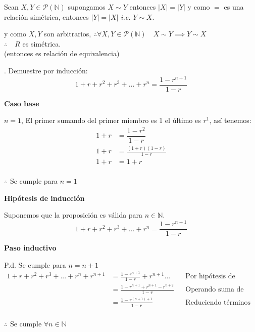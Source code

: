 \documentclass[letterpaper]{article}
\providecommand{\abs}[1]{\left|#1\right|}
\newcommand{\N}{\mathds{N}}
\renewcommand{\P}{\mathcal{P}}
\renewcommand{\*}{\cdot}
\theoremstyle{definition}
\begin{document}
Sean $ X,Y \in \P(\N)$
supongamos $ X \sim Y $ entonces $ \abs{X} = \abs{Y} $ y como $ = $ es una relación simétrica, entonces $ \abs{Y} = \abs{X} $ \textit{i.e. }
$ Y \sim X $.
\begin{center}
	y como $ X,Y $ son arbitrarios, $\therefore \forall X, Y \in \P(\N) \quad X \sim Y  \implies Y \sim X  $\\
	$ \therefore \quad R $ es simétrica.\\
	(entonces es relación de equivalencia)
\end{center}
\newpage{}. Demuestre por inducción:
$$1+r+r^2+r^3+...+r^n=\frac{1-r^{n+1}}{1-r}$$
\begin{flushright}
	\textbf{Caso base} 
\end{flushright}
$ n=1 $, El primer sumando del primer miembro es 1 el último es $r^1$, así tenemos:
\begin{align*}
	1 + r & = \dfrac{1-r^2}{1-r}\\
	1 + r & = \frac{(1+r)(1-r)}{1-r}\\
	1 + r & = 1+r\\
\end{align*}
\begin{center}
	$ \therefore $  Se cumple para $n=1$
\end{center}

\begin{flushright}
	\textbf{Hipótesis de inducción}
\end{flushright}
Suponemos que la proposición es válida para $n \in \mathbb{N}.$\\
$$1+r+r^2+r^3+...+r^n=\frac{1-r^{n+1}}{1-r}$$
\begin{flushright}
\textbf{Paso inductivo}
\end{flushright}
P.d. Se cumple para $ n=n+1 $
\begin{align*}
	1+r+r^2+r^3+...+r^n+r^{n+1}&=\frac{1-r^{n+1}}{1-r}+r^{n+1}...&& \text{Por hipótesis de inducción}\\
	&=\frac{1-r^{n+1}+r^{n+1}-r^{n+2}}{1-r} &&\text{Operando suma de fracciones}\\
	&=\frac{1-r^{(n+1)+1}}{1-r} && \text{Reduciendo términos}\\
\end{align*}
\begin{center}
	$\therefore$ Se  cumple  $\forall{n} \in \mathbb{N}$\\
\end{center}
\end{document}
